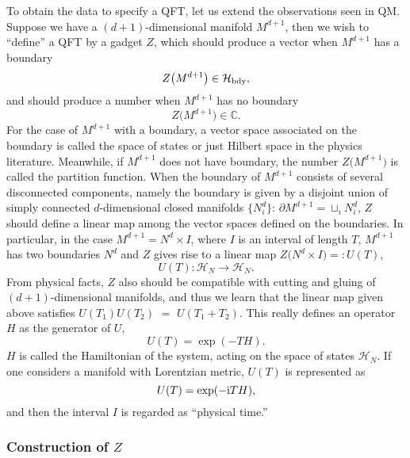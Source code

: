 To obtain the data to specify a QFT, let us extend the
observations seen in QM. Suppose we have a $(d+1)$-dimensional manifold
$M^{d+1}$, then we wish to ``define'' a QFT by a gadget $Z$, which
should produce a vector when $M^{d+1}$ has a boundary
\begin{equation}
Z\big(M^{d+1}\big)  \in  \mathcal{H}_{\rm{bdy}},
\end{equation}
and should produce a number when $M^{d+1}$ has no boundary
\begin{equation}
Z\big(M^{d+1}\big)  \in  \mathbb{C}.
\end{equation}
For the case of $M^{d+1}$ with a boundary, a vector space associated
on the boundary is called the space of states or just Hilbert space
in the physics literature. Meanwhile, if $M^{d+1}$ does not
have boundary, the number $Z\big(M^{d+1}\big)$ is called the partition
function. When the boundary of $M^{d+1}$ consists of several disconnected components,
namely the boundary is given by a disjoint union of simply connected
$d$-dimensional closed manifolds $\big\{ N_{i}^{d}\big\}$: $\partial M^{d+1}=\sqcup_{i}N_{i}^{d}$,
$Z$ should define a linear map among the vector spaces defined on
the boundaries. In particular, in the case $M^{d+1}=N^{d}\times I$,
where $I$ is an interval of length $T$, $M^{d+1}$ has two boundaries
$N^{d}$ and $Z$ gives rise to a linear map $Z\big(N^{d}\times I\big)=:U(T)$,
\begin{equation}
  U(T) : \mathcal{H}_{N} \longrightarrow \mathcal{H}_{N}.
\end{equation}
From  physical facts, $Z$ also should be compatible with cutting and
gluing of $(d+1)$-dimensional manifolds, and thus we learn that the
linear map given above satisfies $U(T_{1})U(T_{2})$ $=$ $U(T_{1}+T_{2})$.
This really defines an operator $H$ as the generator of $U$,
\begin{equation}
  U(T)  =  \exp (-TH).
\end{equation}
$H$ is called the Hamiltonian of the system, acting on the space
of states $\mathcal{H}_{N}$. If one considers a manifold
with Lorentzian metric, $U(T)$ is represented as
\begin{equation}
  U(T)  =  \exp (-\mathrm{i} TH),
\end{equation}
and then the interval $I$ is regarded as ``physical time.''







\subsubsection{Construction of $Z$}

